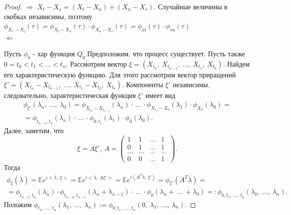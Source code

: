 \begin{proof}
$\Longrightarrow$ $X_t - X_s = (X_t - X_u) + (X_u - X_s)$. Случайные величины в скобках независимы, поэтому $\phi_{X_s - X_t}(\tau) =\phi_{X_t - X_u}(\tau)\cdot\phi_{X_u - X_s}(\tau) = \phi_{ut}(\tau)\cdot\phi_{su}(\tau)$
\\
$\Longleftarrow$ 



Пусть $\phi_0$ - хар функция $Q_0$.Предположим, что процесс существует. Пусть также $\displaystyle 0=t_{0} < t_{1} < \dotsc < t_{n}$. Рассмотрим вектор $\displaystyle \xi =( X_{t_{n}} ,\ X_{t_{n-1}} ,\ \dotsc ,\ X_{t_{1}} ,\ X_{t_{0}})$. Найдем его характеристическую функцию. Для этого рассмотрим вектор приращений $\displaystyle \xi '=( X_{t_{n}} -X_{t_{n-1}} ,\ \dotsc ,\ X_{t_{1}} -X_{t_{0}} ,\ X_{t_{0}})$. Компоненты $\displaystyle \xi '$ независимы, следовательно, характеристическая функция $\displaystyle \xi '$ имеет вид
\begin{gather*}
\phi _{\xi '}( \lambda _{n} ,\ \dotsc ,\ \lambda _{0}) =\phi _{X_{t_{n}} -X_{t_{n-1}}}( \lambda _{n}) \cdotp \ \dotsc \ \cdotp \phi _{X_{t_{1}} -X_{0}}( \lambda _{1}) \cdotp \phi _{X_{0}}( \lambda _{0}) =\\
=\phi _{t_{n-1} ,t_{n}}( \lambda _{n}) \cdotp \ \dotsc \ \cdotp \phi _{0,t_{1}}( \lambda _{1}) \cdotp \phi _{0}( \lambda _{0}) .
\end{gather*}
Далее, заметим, что
\begin{equation*}
\xi =A\xi ',\ A=\begin{pmatrix}
1 & 1 & \dotsc  & 1\\
0 & 1 & \dotsc  & 1\\
\dotsc  & \dotsc  & \dotsc  & \dotsc \\
0 & 0 & \dotsc  & 1
\end{pmatrix} .
\end{equation*}
Тогда
\begin{gather*}
\phi _{\xi }(\overline{\lambda }) =\mathbb{E} e^{i< \overline{\lambda } ,\ \xi > } =\mathbb{E} e^{i< \overline{\lambda } ,\ A\xi '> } =\mathbb{E} e^{i\left< A^{T}\overline{\lambda } ,\ \xi '\right> } =\phi _{\xi '}\left( A^{T}\overline{\lambda }\right) =\\
=\phi _{t_{n-1} ,t_{n}}( \lambda _{n}) \cdotp \phi _{t_{n-2} ,t_{n-1}}( \lambda _{n} +\lambda _{n-1}) \cdotp \ \dotsc \ \cdotp \phi _{0}( \lambda _{n} +\ \dotsc \ +\lambda _{0}) =:\phi _{0,t_{1} ,\ \dotsc ,\ t_{n}}( \lambda _{0} ,\ \dotsc ,\ \lambda _{n}) .
\end{gather*}
Положим $\displaystyle \phi _{t_{1} ,\ \dotsc ,\ t_{n}}( \lambda _{1} ,\ \dotsc ,\ \lambda _{n}) :=\phi _{0,t_{1} ,\ \dotsc ,\ t_{n}}( 0,\ \lambda _{1} ,\ \dotsc ,\ \lambda _{n})$.


\end{proof}

